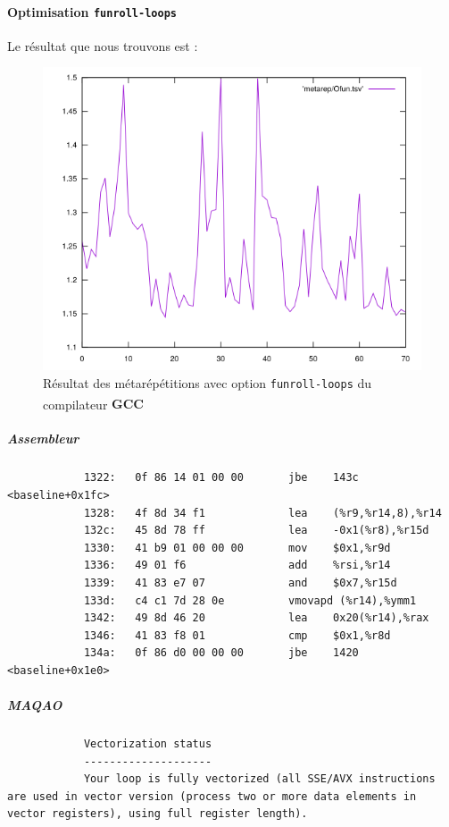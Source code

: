 \documentclass{report}
\begin{document}
	      \paragraph{Optimisation \texttt{funroll-loops}}
        Le résultat que nous trouvons est :
        \begin{figure}[ht!]
          \centering
          \includegraphics[scale=0.45]{resources/L1/metarep/Ofun.png}
          \caption{Résultat des métarépétitions avec option \texttt{funroll-loops} du compilateur \textbf{GCC\textsuperscript \textcopyleft  }}
        \end{figure}
        \subparagraph{Assembleur}
          \begin{verbatim}
            1322:	0f 86 14 01 00 00    	jbe    143c <baseline+0x1fc>
            1328:	4f 8d 34 f1          	lea    (%r9,%r14,8),%r14
            132c:	45 8d 78 ff          	lea    -0x1(%r8),%r15d
            1330:	41 b9 01 00 00 00    	mov    $0x1,%r9d
            1336:	49 01 f6             	add    %rsi,%r14
            1339:	41 83 e7 07          	and    $0x7,%r15d
            133d:	c4 c1 7d 28 0e       	vmovapd (%r14),%ymm1
            1342:	49 8d 46 20          	lea    0x20(%r14),%rax
            1346:	41 83 f8 01          	cmp    $0x1,%r8d
            134a:	0f 86 d0 00 00 00    	jbe    1420 <baseline+0x1e0>
          \end{verbatim}
        \subparagraph{MAQAO}
          \begin{verbatim}
            Vectorization status
            --------------------
            Your loop is fully vectorized (all SSE/AVX instructions are used in vector version (process two or more data elements in vector registers), using full register length).
          \end{verbatim}
      \newpage
\end{document}
